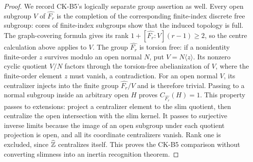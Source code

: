 \begin{proof}
We record CK-B5's logically separate group assertion as well.
Every open subgroup $V$ of $\widehat{F_r}$ is the completion of
the corresponding finite-index discrete free subgroup: cores of
finite-index subgroups show that the induced topology is full.
The graph-covering formula gives its rank
$1+[\widehat{F_r}:V](r-1)\ge2$, so the centre calculation above
applies to $V$. The group $\widehat{F_r}$ is torsion free:
if a nonidentity finite-order $z$ survives modulo an open normal
$N$, put $V=N\langle z\rangle$. Its nonzero cyclic quotient
$V/N$ factors through the torsion-free abelianization of $V$,
where the finite-order element $z$ must vanish, a contradiction.
For an open normal $V$, its centralizer injects into the finite
group $\widehat{F_r}/V$ and is therefore trivial. Passing to a
normal subgroup inside an arbitrary open $H$ proves
$C_{\widehat{F_r}}(H)=1$.
This property passes to extensions: project a centralizer element
to the slim quotient, then centralize the open intersection with
the slim kernel. It passes to surjective inverse limits because
the image of an open subgroup under each quotient projection is
open, and all its coordinate centralizers vanish. Rank one is
excluded, since $\widehat{\mathbb Z}$ centralizes itself. This proves the
CK-B5 comparison without converting slimness into an inertia
recognition theorem.
\end{proof}

